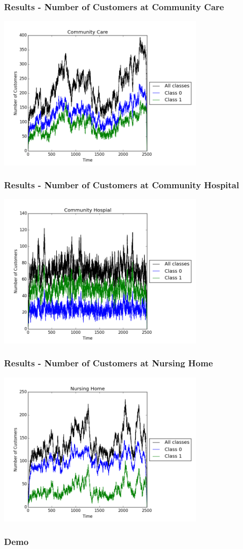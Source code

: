 \documentclass{beamer}
\begin{document}
\begin{frame}
	\frametitle{Results - Number of Customers at Community Care}
  \includegraphics[width=10cm]{Images/cfm_example_CommunityCare}
\end{frame}

\begin{frame}
	\frametitle{Results - Number of Customers at Community Hospital}
  \includegraphics[width=10cm]{Images/cfm_example_CommunityHospital}
\end{frame}

\begin{frame}
	\frametitle{Results - Number of Customers at Nursing Home}
  \includegraphics[width=10cm]{Images/cfm_example_NursingHome}
\end{frame}

\begin{frame}
	\frametitle{Demo}
\end{frame}
\end{document}
